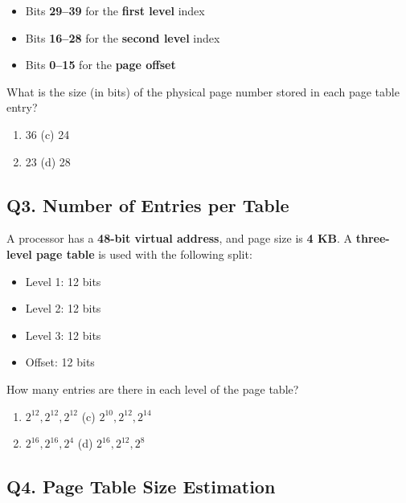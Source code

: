 \begin{itemize}
    \item Bits \textbf{29--39} for the \textbf{first level} index
    \item Bits \textbf{16--28} for the \textbf{second level} index
    \item Bits \textbf{0--15} for the \textbf{page offset}
\end{itemize}

What is the size (in bits) of the physical page number stored in each page table entry?

\begin{enumerate}[label=(\alph*)]
    \item 36 \hspace{5cm} (c) 24
    \item 23 \hspace{5cm} (d) 28
\end{enumerate}

\subsection*{Q3. Number of Entries per Table}

A processor has a \textbf{48-bit virtual address}, and page size is \textbf{4 KB}. A \textbf{three-level page table} is used with the following split:

\begin{itemize}
    \item Level 1: 12 bits
    \item Level 2: 12 bits
    \item Level 3: 12 bits
    \item Offset: 12 bits
\end{itemize}

How many entries are there in each level of the page table?

\begin{enumerate}[label=(\alph*)]
    \item $2^{12}, 2^{12}, 2^{12}$ \hspace{5cm} (c) $2^{10}, 2^{12}, 2^{14}$
    \item $2^{16}, 2^{16}, 2^{4}$  \hspace{5cm} (d) $2^{16}, 2^{12}, 2^{8}$
\end{enumerate}

\subsection*{Q4. Page Table Size Estimation}

